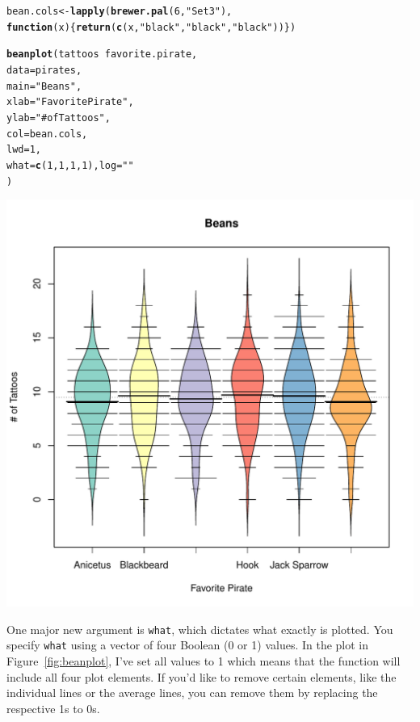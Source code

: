 \documentclass{tufte-book}\usepackage[]{graphicx}\usepackage[]{color}
\makeatletter
\def\maxwidth{ %
  \ifdim\Gin@nat@width>\linewidth
    \linewidth
  \else
    \Gin@nat@width
  \fi
}
\newcommand{\hlnum}[1]{\textcolor[rgb]{0.686,0.059,0.569}{#1}}%
\newcommand{\hlstr}[1]{\textcolor[rgb]{0.192,0.494,0.8}{#1}}%
\newcommand{\hlopt}[1]{\textcolor[rgb]{0,0,0}{#1}}%
\newcommand{\hlstd}[1]{\textcolor[rgb]{0.345,0.345,0.345}{#1}}%
\newcommand{\hlkwa}[1]{\textcolor[rgb]{0.161,0.373,0.58}{\textbf{#1}}}%
\newcommand{\hlkwb}[1]{\textcolor[rgb]{0.69,0.353,0.396}{#1}}%
\newcommand{\hlkwc}[1]{\textcolor[rgb]{0.333,0.667,0.333}{#1}}%
\newcommand{\hlkwd}[1]{\textcolor[rgb]{0.737,0.353,0.396}{\textbf{#1}}}%
\newenvironment{kframe}{%
 \def\at@end@of@kframe{}%
 \ifinner\ifhmode%
  \def\at@end@of@kframe{\end{minipage}}%
  \begin{minipage}{\columnwidth}%
 \fi\fi%
 \def\FrameCommand##1{\hskip\@totalleftmargin \hskip-\fboxsep
 \colorbox{shadecolor}{##1}\hskip-\fboxsep
     \hskip-\linewidth \hskip-\@totalleftmargin \hskip\columnwidth}%
 \MakeFramed {\advance\hsize-\width
   \@totalleftmargin\z@ \linewidth\hsize
   \@setminipage}}%
 {\par\unskip\endMakeFramed%
 \at@end@of@kframe}
\newenvironment{knitrout}{}{} %
\makeatother
\begin{document}
\begin{footnotesize}
\begin{footnotesize}
\begin{knitrout}
\begin{kframe}
\begin{alltt}
\hlstd{bean.cols} \hlkwb{<-} \hlkwd{lapply}\hlstd{(}\hlkwd{brewer.pal}\hlstd{(}\hlnum{6}\hlstd{,} \hlstr{"Set3"}\hlstd{),}
                    \hlkwa{function}\hlstd{(}\hlkwc{x}\hlstd{) \{}\hlkwd{return}\hlstd{(}\hlkwd{c}\hlstd{(x,} \hlstr{"black"}\hlstd{,} \hlstr{"black"}\hlstd{,} \hlstr{"black"}\hlstd{))\})}

\hlkwd{beanplot}\hlstd{(tattoos} \hlopt{~} \hlstd{favorite.pirate,}
         \hlkwc{data} \hlstd{= pirates,}
         \hlkwc{main} \hlstd{=} \hlstr{"Beans"}\hlstd{,}
         \hlkwc{xlab} \hlstd{=} \hlstr{"Favorite Pirate"}\hlstd{,}
         \hlkwc{ylab} \hlstd{=} \hlstr{"# of Tattoos"}\hlstd{,}
         \hlkwc{col} \hlstd{= bean.cols ,}
         \hlkwc{lwd} \hlstd{=} \hlnum{1}\hlstd{,}
         \hlkwc{what} \hlstd{=} \hlkwd{c}\hlstd{(}\hlnum{1}\hlstd{,} \hlnum{1}\hlstd{,} \hlnum{1}\hlstd{,} \hlnum{1}\hlstd{),} \hlkwc{log} \hlstd{=} \hlstr{""}
         \hlstd{)}
\end{alltt}
\end{kframe}
\includegraphics[width=\maxwidth]{figure/unnamed-chunk-149-1} 

\end{knitrout}
\end{footnotesize}

One major new argument is \texttt{what}, which dictates what exactly is plotted. You specify \texttt{what} using a vector of four Boolean (0 or 1) values. In the plot in Figure~\ref{fig:beanplot}, I've set all values to 1 which means that the function will include all four plot elements. If you'd like to remove certain elements, like the individual lines or the average lines, you can remove them by replacing the respective 1s to 0s.






\end{footnotesize}
\end{document}
